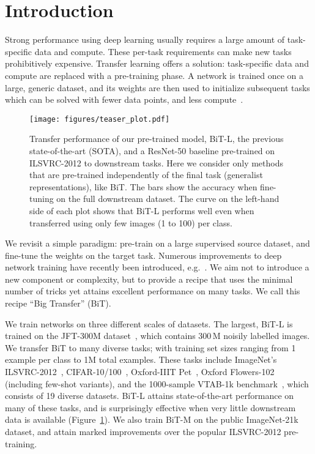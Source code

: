 \documentclass[runningheads]{llncs}
\newcommand{\name}{{BiT}}
\newcommand{\imagenet}{{ILSVRC-2012}}
\begin{document}
\section{Introduction}
Strong performance using deep learning usually requires a large amount of task-specific data and compute.
These per-task requirements can make new tasks prohibitively expensive.
Transfer learning offers a solution: 
task-specific data and compute are replaced with a pre-training phase.
A network is trained once on a large, generic dataset, and its weights are then used to initialize subsequent tasks which can be solved with fewer data points, and less compute~\cite{pan2009survey,raghu2019,he2019rethinking}.


\begin{figure}[t]
  \centering
  \texttt{[image: figures/teaser\_plot.pdf]}
  \caption{Transfer performance of our pre-trained model, \name{}-L, the previous state-of-the-art (SOTA), and a ResNet-50 baseline pre-trained on \imagenet{} to downstream tasks.
Here we consider only methods that are pre-trained independently of the final task (generalist representations), like \name{}.
The bars show the accuracy when fine-tuning on the full downstream dataset.
The curve on the left-hand side of each plot shows that \name{}-L performs well even when transferred using only few images (1 to 100) per class.
}\label{fig:teaser_plot}
\vspace{-3mm}
\end{figure}

We revisit a simple paradigm:
pre-train on a large supervised source dataset, and fine-tune the weights on the target task.
Numerous improvements to deep network training have recently been introduced, e.g.~\cite{tan2019efficientnet,xie2017aggregated,kingma2014adam,loshchilov2016sgdr,izmailov2018averaging,fast_swa,yun2019cutmix,mixup,szegedy2016rethinking,wu2018group}.
We aim not to introduce a new component or complexity, but to provide a recipe that uses the minimal number of tricks yet attains excellent performance on many tasks.
We call this recipe ``Big Transfer'' (\name{}).

We train networks on three different scales of datasets.
The largest, \name{}-L is trained on the JFT-300M dataset~\cite{sun2017revisiting}, which contains 300\,M noisily labelled images.
We transfer \name{} to many diverse tasks; with training set sizes ranging from 1 example per class to 1M total examples.
These tasks include ImageNet's ILSVRC-2012~\cite{deng2009imagenet}, CIFAR-10/100~\cite{cifar10}, Oxford-IIIT Pet~\cite{parkhi12a}, Oxford Flowers-102~\cite{Nilsback08} (including few-shot variants), and the 1000-sample VTAB-1k benchmark~\cite{zhai2019visual}, which consists of 19 diverse datasets.
\name{}-L attains state-of-the-art performance on many of these tasks, and is surprisingly effective when very little downstream data is available (Figure~\ref{fig:teaser_plot}).
We also train \name{}-M on the public ImageNet-21k dataset, and attain marked improvements over the popular \imagenet{} pre-training.
\end{document}
